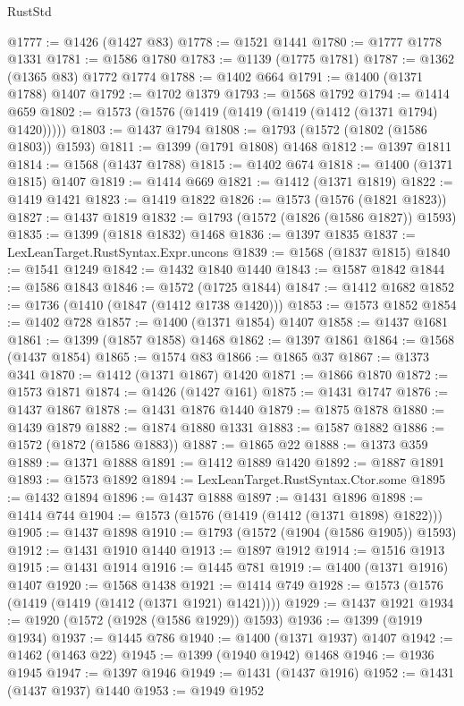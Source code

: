 \begin{lexlean}{RustStd}
\begin{coremodule}
@1777 := @1426 (@1427 @83)
@1778 := @1521 @1441
@1780 := @1777 @1778 @1331
@1781 := @1586 @1780
@1783 := @1139 (@1775 @1781)
@1787 := @1362 (@1365 @83) @1772 @1774
@1788 := @1402 @664
@1791 := @1400 (@1371 @1788) @1407
@1792 := @1702 @1379
@1793 := @1568 @1792
@1794 := @1414 @659
@1802 := @1573 (@1576 (@1419 (@1419 (@1419 (@1412 (@1371 @1794) @1420)))))
@1803 := @1437 @1794
@1808 := @1793 (@1572 (@1802 (@1586 @1803)) @1593)
@1811 := @1399 (@1791 @1808) @1468
@1812 := @1397 @1811
@1814 := @1568 (@1437 @1788)
@1815 := @1402 @674
@1818 := @1400 (@1371 @1815) @1407
@1819 := @1414 @669
@1821 := @1412 (@1371 @1819)
@1822 := @1419 @1421
@1823 := @1419 @1822
@1826 := @1573 (@1576 (@1821 @1823))
@1827 := @1437 @1819
@1832 := @1793 (@1572 (@1826 (@1586 @1827)) @1593)
@1835 := @1399 (@1818 @1832) @1468
@1836 := @1397 @1835
@1837 := LexLeanTarget.RustSyntax.Expr.uncons
@1839 := @1568 (@1837 @1815)
@1840 := @1541 @1249
@1842 := @1432 @1840 @1440
@1843 := @1587 @1842
@1844 := @1586 @1843
@1846 := @1572 (@1725 @1844)
@1847 := @1412 @1682
@1852 := @1736 (@1410 (@1847 (@1412 @1738 @1420)))
@1853 := @1573 @1852
@1854 := @1402 @728
@1857 := @1400 (@1371 @1854) @1407
@1858 := @1437 @1681
@1861 := @1399 (@1857 @1858) @1468
@1862 := @1397 @1861
@1864 := @1568 (@1437 @1854)
@1865 := @1574 @83
@1866 := @1865 @37
@1867 := @1373 @341
@1870 := @1412 (@1371 @1867) @1420
@1871 := @1866 @1870
@1872 := @1573 @1871
@1874 := @1426 (@1427 @161)
@1875 := @1431 @1747
@1876 := @1437 @1867
@1878 := @1431 @1876 @1440
@1879 := @1875 @1878
@1880 := @1439 @1879
@1882 := @1874 @1880 @1331
@1883 := @1587 @1882
@1886 := @1572 (@1872 (@1586 @1883))
@1887 := @1865 @22
@1888 := @1373 @359
@1889 := @1371 @1888
@1891 := @1412 @1889 @1420
@1892 := @1887 @1891
@1893 := @1573 @1892
@1894 := LexLeanTarget.RustSyntax.Ctor.some
@1895 := @1432 @1894
@1896 := @1437 @1888
@1897 := @1431 @1896
@1898 := @1414 @744
@1904 := @1573 (@1576 (@1419 (@1412 (@1371 @1898) @1822)))
@1905 := @1437 @1898
@1910 := @1793 (@1572 (@1904 (@1586 @1905)) @1593)
@1912 := @1431 @1910 @1440
@1913 := @1897 @1912
@1914 := @1516 @1913
@1915 := @1431 @1914
@1916 := @1445 @781
@1919 := @1400 (@1371 @1916) @1407
@1920 := @1568 @1438
@1921 := @1414 @749
@1928 := @1573 (@1576 (@1419 (@1419 (@1412 (@1371 @1921) @1421))))
@1929 := @1437 @1921
@1934 := @1920 (@1572 (@1928 (@1586 @1929)) @1593)
@1936 := @1399 (@1919 @1934)
@1937 := @1445 @786
@1940 := @1400 (@1371 @1937) @1407
@1942 := @1462 (@1463 @22)
@1945 := @1399 (@1940 @1942) @1468
@1946 := @1936 @1945
@1947 := @1397 @1946
@1949 := @1431 (@1437 @1916)
@1952 := @1431 (@1437 @1937) @1440
@1953 := @1949 @1952

\end{coremodule}
\end{lexlean}
